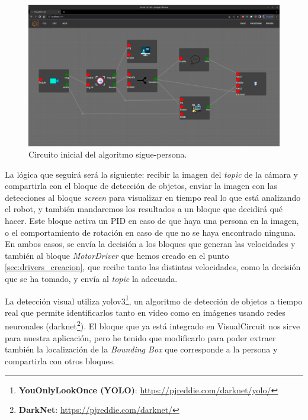 \begin{figure} [H]
    \begin{center}
        \includegraphics[width=12cm]{figs/c5/follow_person_initial.png}
    \end{center}
    \caption[Circuito sigue-personas inicial]{Circuito inicial del algoritmo sigue-persona.}
    \label{fig:initial_follow_person}
\end{figure}

La lógica que seguirá será la siguiente: recibir la imagen del \textit{topic} de la cámara y compartirla con el bloque de detección de objetos,
enviar la imagen con las detecciones al bloque \textit{screen} para visualizar en tiempo real lo que está analizando el robot,
y también mandaremos los resultados a un bloque que decidirá qué hacer. Este bloque activa un PID en caso de que haya una persona en la imagen,
o el comportamiento de rotación en caso de que no se haya encontrado ninguna.
En ambos casos, se envía la decisión a los bloques que generan las velocidades y también al bloque \textit{MotorDriver} que hemos creado en
el punto \ref{sec:drivers_creacion}, que recibe tanto las distintas velocidades, como la decisión que se ha tomado, y envía al \textit{topic} la adecuada.

La detección visual utiliza yolov3\footnote{\textbf{YouOnlyLookOnce (YOLO)}: \url{https://pjreddie.com/darknet/yolo/}},
un algoritmo de detección de objetos a tiempo real que permite identificarlos tanto en video como en imágenes usando redes neuronales
(darknet\footnote{\textbf{DarkNet}: \url{https://pjreddie.com/darknet/}}). El bloque que ya está integrado en VisualCircuit nos sirve para nuestra aplicación,
pero he tenido que modificarlo para poder extraer también la localización de la \textit{Bounding Box} que corresponde a la persona y compartirla con otros bloques.\\

